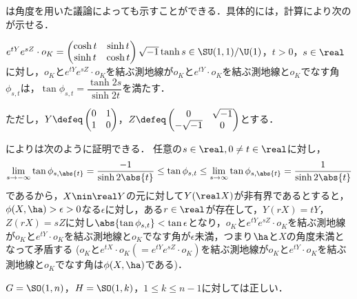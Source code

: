 \begin{rem}\label{rem:su11-by-angle}

  は角度を用いた議論によっても示すことができる．具体的には，計算により次のが示せる．
  \begin{lem}\label{lem:0106}
    $e^{tY}e^{s Z}\cdot o_K =
    \begin{pmatrix}
      \cosh t & \sinh t\\ \sinh t & \cosh t
    \end{pmatrix}
    \sqrt{-1}\tanh s \in \SU(1,1)/\U(1) $，$t > 0$，$s\in \real$に対し，$o_K $と$e^{tY}e^{sZ}\cdot o_K$を結ぶ測地線が$o_K$と$e^{tY}\cdot o_K $を結ぶ測地線と$o_K$でなす角$\phi_{s,t} $は，$\tan \phi_{s,t} = \dfrac{\tanh 2s}{\sinh 2t} $を満たす．
  \end{lem}
  ただし，$Y \defeq
  \begin{pmatrix}
    0 & 1\\ 1 & 0
  \end{pmatrix}
  $，$Z \defeq \begin{pmatrix}
    0 & \sqrt{-1} \\ -\sqrt{-1} & 0
  \end{pmatrix}$とする．

  によりは次のように証明できる．
  任意の$s\in \real, 0\neq t\in \real $に対し，
  \begin{align*}
    \lim_{s\to -\infty}\tan \phi_{s,\abs{t}} = \dfrac{-1}{\sinh 2\abs{t}}  \leq \tan \phi_{s,t} \leq  \lim_{s\to \infty}\tan \phi_{s,\abs{t}} = \dfrac{1}{\sinh 2\abs{t}}
  \end{align*}
  であるから，$X\nin \real Y $の元に対して$Y(\real X) $が非有界であるとすると，$\phi(X,\ha) >  \epsilon > 0$なる$\epsilon$に対し，ある$r\in \real $が存在して，$Y(rX) = tY $，$Z(rX) = sZ $に対し$\abs{\tan \phi_{s,t}} < \tan \epsilon $となり，$o_K$と$e^{tY}e^{sZ}\cdot o_K$を結ぶ測地線が$o_K$と$e^{tY}\cdot o_K $を結ぶ測地線と$o_K$でなす角が$\epsilon$未満，つまり$\ha$と$X$の角度未満となって矛盾する ($o_K$と$e^{tX}\cdot o_K (= e^{tY}e^{sZ}\cdot o_K)  $を結ぶ測地線が$o_K$と$e^{tY}\cdot o_K $を結ぶ測地線と$o_K$でなす角は$\phi(X,\ha)$である)．

  
\end{rem}

\begin{cor}\label{cor:yosou-eg}
  $G = \SO(1,n) $，$H = \SO(1,k) $，$1\leq k\leq n-1$に対しては正しい．
\end{cor}



